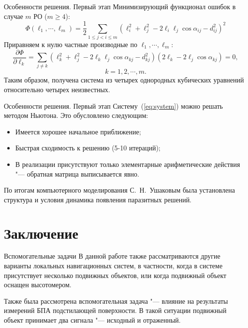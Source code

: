 \documentclass[russian,hyperref={unicode}]{beamer}
\begin{document}
  \begin{frame}{Особенности решения. Первый этап}
    Минимизирующий функционал ошибок в случае $m$ РО ($m \ge 4$):
    \begin{equation*}
      \Phi\left(\ell_1, \cdots, \ell_m \right) = \frac{1}{2}\sum_{1 \leq j < i \leq m} \left(\ell_i^2 + \ell_j^2 - 2 \ell_i \ell_j \cos\alpha_{ij} - d_{ij}^2\right)^2
    \end{equation*}
    Приравняем к нулю частные производные по $\ell_1, \cdots, \ell_m$:
    \begin{equation*}
      \frac{\partial\Phi}{\partial\ell_k} = \sum_{j \ne k} \left(\ell_k^2 + \ell_j^2 - 2 \ell_k \ell_j \cos\alpha_{kj} - d_{kj}^2\right)\left(2 \ell_k - 2 \ell_j \cos\alpha_{kj}\right) = 0,
    \end{equation*}
    \begin{equation*}
      k = 1, 2, \cdots, m.
    \end{equation*}
    Таким образом, получена система из четырех однородных кубических уравнений относительно четырех неизвестных.
  \end{frame}

  \begin{frame}{Особенности решения. Первый этап}
    Систему~(\ref{eq:system}) можно решать методом Ньютона. Это обусловлено следующим:
    \begin{itemize}
      \item Имеется хорошее начальное приближение;
      \item Быстрая сходимость к решению (5-10 итераций);
      \item В реализации присутствуют только элементарные арифметические действия "--- обратная матрица выписывается явно.
    \end{itemize}

    По итогам компьютерного моделирования С.~Н.~Ушаковым была установлена структура и условия динамика появления паразитных решений.
  \end{frame}

  \section{Заключение}

  \begin{frame}{Вспомогательные задачи}
    В данной работе также рассматриваются другие варианты локальных навигационных систем, в частности, когда в системе присутствует несколько подвижных объектов, или когда подвижный объект оснащен высотомером.

    Также была рассмотрена вспомогательная задача "--- влияние на результаты измерений БПА подстилающей поверхности. В такой ситуации подвижный объект принимает два сигнала "--- исходный и отраженный.
  \end{frame}
\end{document}
